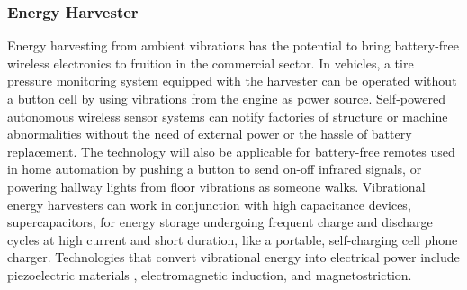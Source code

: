 \subsubsection{Energy Harvester}
Energy harvesting from ambient vibrations has the potential to bring battery-free wireless electronics to fruition in the commercial sector. In vehicles, a tire pressure monitoring system equipped with the harvester can be operated without a button cell by using vibrations from the engine as power source. Self-powered autonomous wireless sensor systems can notify factories of structure or machine abnormalities without the need of external power or the hassle of battery replacement. The technology will also be applicable for battery-free remotes used in home automation by pushing a button to send on-off infrared signals, or powering hallway lights from floor vibrations as someone walks. Vibrational energy harvesters can work in conjunction with high capacitance devices, supercapacitors, for energy storage undergoing frequent charge and discharge cycles at high current and short duration, like a portable, self-charging cell phone charger. Technologies that convert vibrational energy into electrical power include piezoelectric materials \cite{Gonzalez2002}, electromagnetic induction\cite{Saha2008}, and magnetostriction\cite{Ueno2011}. 


